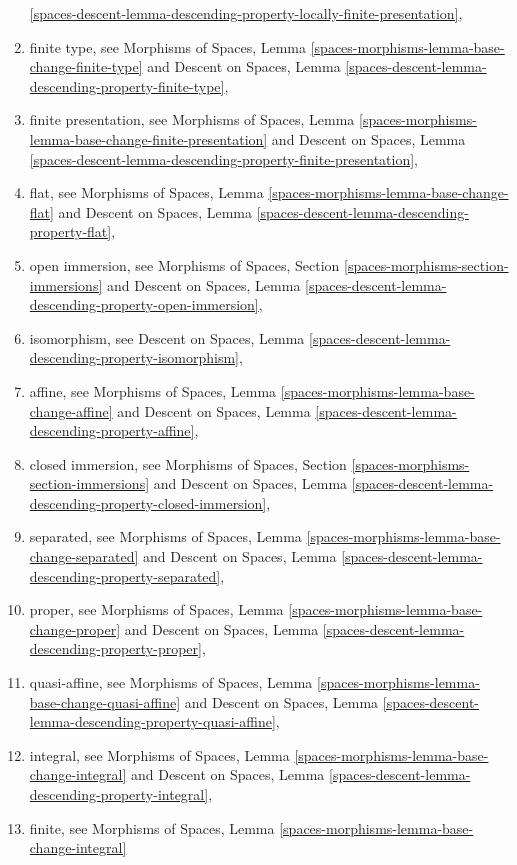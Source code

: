 \begin{enumerate}
\ref{spaces-descent-lemma-descending-property-locally-finite-presentation},
\item finite type, see
Morphisms of Spaces,
Lemma \ref{spaces-morphisms-lemma-base-change-finite-type}
and
Descent on Spaces,
Lemma \ref{spaces-descent-lemma-descending-property-finite-type},
\item finite presentation, see
Morphisms of Spaces,
Lemma \ref{spaces-morphisms-lemma-base-change-finite-presentation}
and
Descent on Spaces, Lemma
\ref{spaces-descent-lemma-descending-property-finite-presentation},
\item flat, see
Morphisms of Spaces,
Lemma \ref{spaces-morphisms-lemma-base-change-flat}
and
Descent on Spaces,
Lemma \ref{spaces-descent-lemma-descending-property-flat},
\item open immersion, see
Morphisms of Spaces,
Section \ref{spaces-morphisms-section-immersions}
and
Descent on Spaces,
Lemma \ref{spaces-descent-lemma-descending-property-open-immersion},
\item isomorphism, see
Descent on Spaces,
Lemma \ref{spaces-descent-lemma-descending-property-isomorphism},
\item affine, see
Morphisms of Spaces,
Lemma \ref{spaces-morphisms-lemma-base-change-affine}
and
Descent on Spaces,
Lemma \ref{spaces-descent-lemma-descending-property-affine},
\item closed immersion, see
Morphisms of Spaces, Section \ref{spaces-morphisms-section-immersions}
and
Descent on Spaces,
Lemma \ref{spaces-descent-lemma-descending-property-closed-immersion},
\item separated, see
Morphisms of Spaces,
Lemma \ref{spaces-morphisms-lemma-base-change-separated}
and
Descent on Spaces,
Lemma \ref{spaces-descent-lemma-descending-property-separated},
\item proper, see
Morphisms of Spaces,
Lemma \ref{spaces-morphisms-lemma-base-change-proper}
and
Descent on Spaces,
Lemma \ref{spaces-descent-lemma-descending-property-proper},
\item quasi-affine, see
Morphisms of Spaces,
Lemma \ref{spaces-morphisms-lemma-base-change-quasi-affine}
and
Descent on Spaces,
Lemma \ref{spaces-descent-lemma-descending-property-quasi-affine},
\item integral, see
Morphisms of Spaces,
Lemma \ref{spaces-morphisms-lemma-base-change-integral}
and
Descent on Spaces,
Lemma \ref{spaces-descent-lemma-descending-property-integral},
\item finite, see
Morphisms of Spaces,
Lemma \ref{spaces-morphisms-lemma-base-change-integral}

\end{enumerate}
